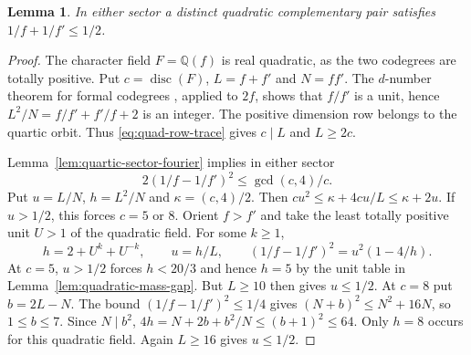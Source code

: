 \documentclass[11pt,reqno]{amsart}
\newtheorem{lemma}[theorem]{Lemma}
\theoremstyle{remark}\newtheorem{remark}[theorem]{Remark}
\numberwithin{equation}{section}
\begin{document}
\begin{lemma}\label{thm:quadratic-pair-mass}
In either sector a distinct quadratic complementary pair satisfies $1/f+1/f'\le1/2$.
\end{lemma}
\begin{proof}
The character field $F=\mathbb Q(f)$ is real quadratic, as the two
codegrees are totally positive. Put $c=\operatorname{disc}(F)$,
$L=f+f'$ and $N=ff'$. The $d$-number theorem for formal codegrees
\cite{OstrikCodegrees}, applied to $2f$, shows that $f/f'$ is a
unit, hence $L^2/N=f/f'+f'/f+2$ is an integer. The positive dimension row belongs to the quartic orbit.
Thus \eqref{eq:quad-row-trace} gives $c\mid L$ and $L\ge2c$.

Lemma~\ref{lem:quartic-sector-fourier} implies in either sector
\begin{equation}\label{eq:quad-row-fourier}
 2\left(1/f-1/f'\right)^2\le\gcd(c,4)/c .
\end{equation}
Put $u=L/N$, $h=L^2/N$ and $\kappa=(c,4)/2$. Then
$c u^2\le\kappa+4cu/L\le\kappa+2u$. If $u>1/2$, this
forces $c=5$ or $8$. Orient $f>f'$ and take the least totally
positive unit $U>1$ of the quadratic field. For some $k\ge1$,
\[
 h=2+U^k+U^{-k},\qquad u=h/L,\qquad
 (1/f-1/f')^2=u^2(1-4/h).
\]
At $c=5$, $u>1/2$ forces $h<20/3$ and hence $h=5$
by the unit table in Lemma~\ref{lem:quadratic-mass-gap}.
But $L\ge10$ then gives $u\le1/2$.
At $c=8$ put $b=2L-N$. The bound $(1/f-1/f')^2\le1/4$
gives $(N+b)^2\le N^2+16N$, so $1\le b\le7$.
Since $N\mid b^2$,
$4h=N+2b+b^2/N\le(b+1)^2\le64$.
Only $h=8$ occurs for this quadratic field. Again $L\ge16$
gives $u\le1/2$.
\end{proof}
\end{document}
